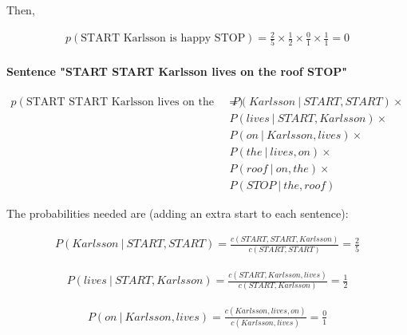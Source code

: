 \documentclass{article}
\newcommand\given[1][]{\:#1\vert\:}
\begin{document}
Then, 

\begin{equation*}
    \begin{split}
    p(\text{START Karlsson is happy STOP}) =\frac{2}{5} \times \frac{1}{2} \times \frac{0}{1} \times \frac{1}{1} = 0
    \end{split}
\end{equation*}

\paragraph{Sentence "START START Karlsson lives on the roof STOP"}

\begin{equation*}
    \begin{split}
    p(\text{START START Karlsson lives on the roof STOP}) =&\ P(Karlsson \given START, START) \times \\
    & P(lives \given START, Karlsson) \times \\
    & P(on \given Karlsson, lives) \times \\
    & P(the \given lives, on) \times \\
    & P(roof \given on, the) \times \\
    & P(STOP \given the, roof)
    \end{split}
\end{equation*}

The probabilities needed are (adding an extra start to each sentence):

\begin{equation*}
    \begin{split}
    P(Karlsson \given START, START) = \frac{c(START, START, Karlsson)}{ c(START, START)} = \frac{2}{5}
    \end{split}
\end{equation*}

\begin{equation*}
    \begin{split}
    P(lives \given START, Karlsson) = \frac{c(START, Karlsson, lives)}{ c(START, Karlsson)} = \frac{1}{2}
    \end{split}
\end{equation*}

\begin{equation*}
    \begin{split}
    P(on \given Karlsson, lives) = \frac{c(Karlsson, lives, on)}{ c( Karlsson, lives)} = \frac{0}{1}
    \end{split}
\end{equation*}
\end{document}
